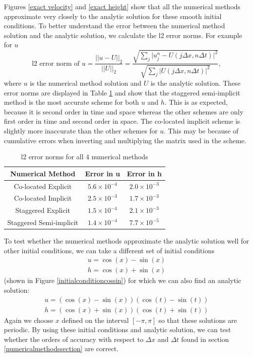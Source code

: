 \documentclass[a4paper, 10pt, notitlepage]{article}
\begin{document}
Figures \ref{exact velocity} and \ref{exact height} show that all the numerical methods approximate very closely to the analytic solution for these smooth initial conditions. To better understand the error between the numerical method solution and the analytic solution, we calculate the l2 error norms. For example for $u$
\begin{equation}
\text{l2 error norm of } u = \frac{\lvert \lvert u - U\rvert\rvert_{2}}{\lvert \lvert U\rvert\rvert _{2}} = \frac{\sqrt{\sum_{j} \lvert u_{j}^{n} - U(j\Delta x, n\Delta t)\rvert^{2}}}{\sqrt{\sum_{j} \lvert U(j\Delta x, n\Delta t)\rvert^{2}}},
\end{equation}
where $u$ is the numerical method solution and $U$ is the analytic solution. These error norms are displayed in Table \ref{errortable} and show that the staggered semi-implicit method is the most accurate scheme for both $u$ and $h$. This is as expected, because it is second order in time and space whereas the other schemes are only first order in time and second order in space. The co-located implicit scheme is slightly more inaccurate than the other schemes for $u$. This may be because of cumulative errors when inverting and multiplying the matrix used in the scheme.
\begin{table}[H]
	\centering
	\begin{tabular}{|c | c| c|} 
		\hline
		\textbf{Numerical Method} & \textbf{Error in u} & \textbf{Error in h}  \\
		\hline
		Co-located Explicit & $5.6 \times 10^{-4}$ & $2.0 \times 10^{-3}$\\ 
		\hline
		Co-located  Implicit & $2.5 \times 10^{-3}$ & $1.7 \times 10^{-3}$ \\
		\hline
		Staggered Explicit &  $1.5 \times 10^{-4}$ & $2.1 \times 10^{-3}$\\
		\hline
		Staggered Semi-implicit & $1.4 \times 10^{-4}$ & $7.7\times 10 ^{-5}$ \\
		\hline
	\end{tabular}
	\caption{l2 error norms for all 4 numerical methods}
	\label{errortable}
\end{table}
To test whether the numerical methods approximate the analytic solution well for other initial conditions, we can take a different set of initial conditions
\begin{eqnarray} \label{ic}
u  =  \cos(x) - \sin(x)\\
 h  =  \cos(x) + \sin(x)
\end{eqnarray}
(shown in Figure \ref{initialconditioncossin}) for which we can also find an analytic solution:
\begin{eqnarray} \label{as}
u = (\cos(x) - \sin(x))(\cos(t) - \sin(t))\\
h = (\cos(x) + \sin(x))(\cos(t) + \sin(t))
\end{eqnarray}
Again we choose $x$ defined on the interval $[-\pi, \pi]$ so that these solutions are periodic. By using these initial conditions and analytic solution, we can test whether the orders of accuracy with respect to $\Delta x$ and $\Delta t$ found  in section \ref{numericalmethodssection} are correct. 
\end{document}
